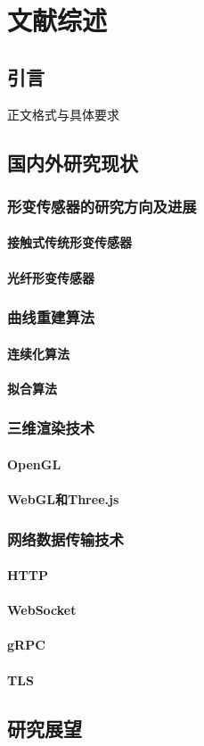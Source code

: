 \cleardoublepage
\chapter{文献综述}

\section{引言}
\par 正文格式与具体要求\cite{zjuthesisrules}

\section{国内外研究现状}
\subsection{形变传感器的研究方向及进展}
\subsubsection{接触式传统形变传感器}
\subsubsection{光纤形变传感器}
\subsection{曲线重建算法}
\subsubsection{连续化算法}
\subsubsection{拟合算法}
\subsection{三维渲染技术}
\subsubsection{OpenGL}
\subsubsection{WebGL和Three.js}
\subsection{网络数据传输技术}
\subsubsection{HTTP}
\subsubsection{WebSocket}
\subsubsection{gRPC}
\subsubsection{TLS}
\section{研究展望}
\newpage
\printbibliography[title={参考文献}]
